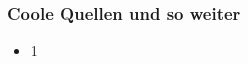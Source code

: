 \documentclass[22pt]{beamer}
\begin{document}
\begin{frame}[t]
    \frametitle{Coole Quellen und so weiter}
    \begin{itemize}
        \item 1
    \end{itemize} 
\end{frame}

\end{document}
